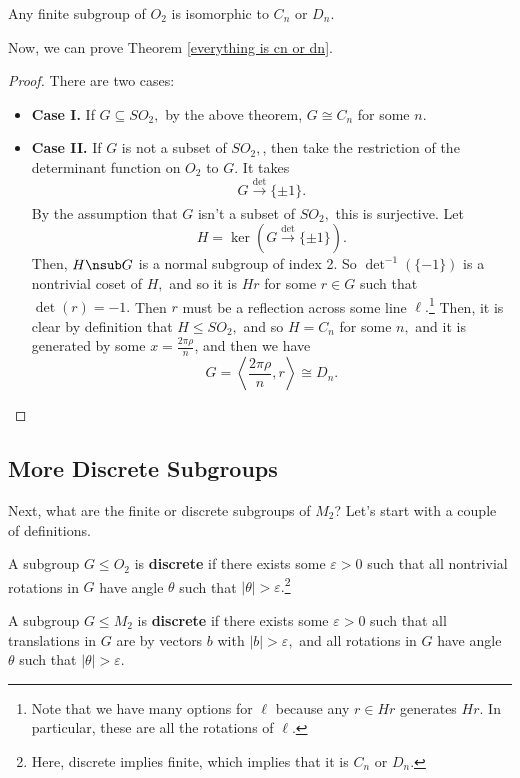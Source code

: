 \begin{theorem}\label{everything is cn or dn}
Any finite subgroup of $O_2$ is isomorphic to $C_n$ or $D_n.$ 
\end{theorem}
Now, we can prove Theorem \ref{everything is cn or dn}. 
\begin{proof}
There are two cases:
\begin{itemize}
    \item \textbf{Case I.} If $G \subseteq SO_2,$ by the above theorem, $G \cong C_n$ for some $n.$
    \item \textbf{Case II.} If $G$ is not a subset of $SO_2,$, then take the restriction of the determinant function on $O_2$ to $G.$ It takes \[G \xrightarrow[]{\det}\{\pm 1\}.\] By the assumption that $G$ isn't a subset of $SO_2,$ this is surjective. Let 
    \[
    H = \ker(G \xrightarrow[]{\det}\{\pm 1\}).
    \]
    Then, $H \nsub G$ is a normal subgroup of index 2. So $\det^{-1}(\{-1\})$ is a nontrivial coset of $H,$ and so it is $Hr$ for some $r \in G$ such that $\det(r) = -1.$ Then $r$ must be a reflection across some line $\ell.$\footnote{Note that we have many options for $\ell$ because any $r\in Hr$ generates $Hr$. In particular, these are all the rotations of $\ell$.} Then, it is clear by definition that $H \leq SO_2,$ and so $H = C_n$ for some $n,$ and it is generated by some $x = \frac{2\pi \rho}{n}$, and then we have 
    \[
    G = \left \langle \frac{2\pi\rho}{n}, r\right \rangle \cong D_n.
    \]
\end{itemize}
\end{proof}

\subsection{More Discrete Subgroups}
Next, what are the finite or discrete subgroups of $M_2$? Let's start with a couple of definitions. 

\begin{definition}
A subgroup $G \leq O_2$ is \textbf{discrete} if there exists some $\varepsilon > 0$ such that all nontrivial rotations in $G$ have angle $\theta$ such that $|\theta| > \varepsilon.$\footnote{Here, discrete implies finite, which implies that it is $C_n$ or $D_n.$}
\end{definition}

\begin{definition}
A subgroup $G \leq M_2$ is \textbf{discrete} if there exists some $\varepsilon > 0$ such that all translations in $G$ are by vectors $b$ with $|b| > \varepsilon,$ and all rotations in $G$ have angle $\theta$ such that $|\theta| > \varepsilon.$
\end{definition}

